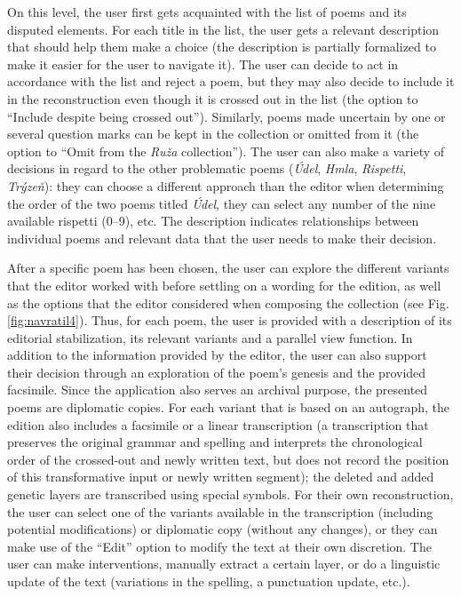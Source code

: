 \begin{paper}
On this level, the user first gets acquainted with the list of poems and
its disputed elements. For each title in the list, the user gets
a relevant description that should help them make a choice (the
description is partially formalized to make it easier for the user to
navigate it). The user can decide to act in accordance with the list and
reject a poem, but they may also decide to include it in the
reconstruction even though it is crossed out in the list (the option to
``Include despite being crossed out''). Similarly, poems made uncertain
by one or several question marks can be kept in the collection or
omitted from it (the option to ``Omit from the \emph{Ruža}
collection''). The user can also make a variety of decisions in regard
to the other problematic poems (\emph{Údel}, \emph{Hmla},
\emph{Rispetti}, \emph{Trýzeň}): they can choose a different approach
than the editor when determining the order of the two poems titled
\emph{Údel}, they can select any number of the nine available rispetti
(0--9), etc. The description indicates relationships between individual
poems and relevant data that the user needs to make their decision.

After a specific poem has been chosen, the user can explore the
different variants that the editor worked with before settling on
a wording for the edition, as well as the options that the editor
considered when composing the collection (see Fig. \ref{fig:navratil4}). Thus, for each poem, the user
is provided with a description of its editorial stabilization, its
relevant variants and a parallel view function. In addition to the
information provided by the editor, the user can also support their
decision through an exploration of the poem's genesis and the provided
facsimile. Since the application also serves an archival purpose, the
presented poems are diplomatic copies. For each variant that is based on
an autograph, the edition also includes a facsimile or a linear
transcription (a transcription that preserves the original grammar and
spelling and interprets the chronological order of the crossed-out and
newly written text, but does not record the position of this
transformative input or newly written segment); the deleted and added
genetic layers are transcribed using special symbols. For their own
reconstruction, the user can select one of the variants available in the
transcription (including potential modifications) or diplomatic copy
(without any changes), or they can make use of the ``Edit'' option to
modify the text at their own discretion. The user can make
interventions, manually extract a certain layer, or do a linguistic
update of the text (variations in the spelling, a punctuation update,
etc.).


\end{paper}
